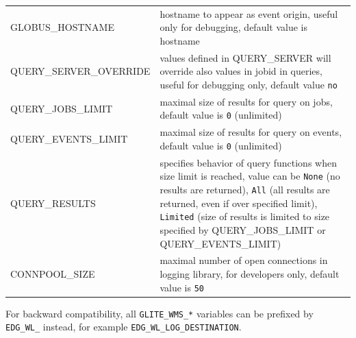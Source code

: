\begin{tabularx}{\textwidth}{lX}
GLOBUS\_HOSTNAME & 
   hostname to appear as event origin, useful only for debugging, 
   default value is hostname \\
QUERY\_SERVER\_OVERRIDE & 
   values defined in QUERY\_SERVER will override also values in jobid in queries,
   useful for debugging only, 
   default value \verb'no' \\
QUERY\_JOBS\_LIMIT & 
   maximal size of results for query on jobs, 
   default value is  \verb'0' (unlimited) \\
QUERY\_EVENTS\_LIMIT & 
   maximal size of results for query on events, 
   default value is  \verb'0' (unlimited) \\
QUERY\_RESULTS & 
   specifies behavior of query functions when size limit is reached,
   value can be \verb'None' (no results are returned),
   \verb'All' (all results are returned, even if over specified limit),
   \verb'Limited' (size of results is limited to size specified by QUERY\_JOBS\_LIMIT
   or QUERY\_EVENTS\_LIMIT) \\
CONNPOOL\_SIZE & 
   maximal number of open connections in logging library,
   for developers only,
   default value is \verb'50' \\
\end{tabularx}

For backward compatibility, all \verb'GLITE_WMS_*' variables can be prefixed by
\verb'EDG_WL_' instead, for example \verb'EDG_WL_LOG_DESTINATION'.
